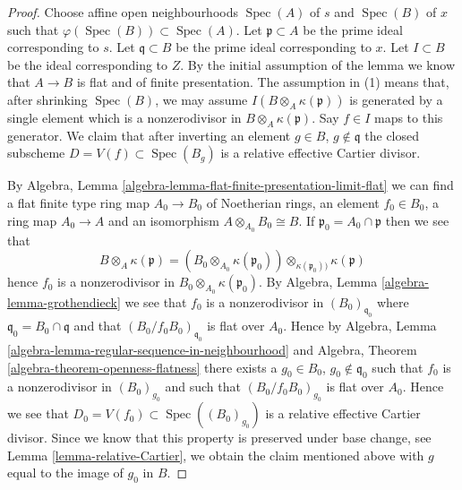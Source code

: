 \documentclass[10pt,a4paper]{amsart}
\theoremstyle{plain}
\theoremstyle{definition}
\theoremstyle{remark}
\numberwithin{equation}{subsection}
\def\Spec{\mathop{\mathrm{Spec}}}
\begin{document}
\begin{proof}
Choose affine open neighbourhoods $\Spec(A)$ of $s$ and
$\Spec(B)$ of $x$ such that
$\varphi(\Spec(B)) \subset \Spec(A)$.
Let $\mathfrak p \subset A$ be the prime ideal corresponding to $s$.
Let $\mathfrak q \subset B$ be the prime ideal corresponding to $x$.
Let $I \subset B$ be the ideal corresponding to $Z$.
By the initial assumption of the lemma we know that
$A \to B$ is flat and of finite presentation.
The assumption in (1) means that, after shrinking $\Spec(B)$, we may
assume $I(B \otimes_A \kappa(\mathfrak p))$ is generated by a single
element which is a nonzerodivisor in $B \otimes_A \kappa(\mathfrak p)$.
Say $f \in I$ maps to this generator. We claim that after inverting
an element $g \in B$, $g \not \in \mathfrak q$ the closed subscheme
$D = V(f) \subset \Spec(B_g)$ is a relative effective Cartier
divisor.

\medskip\noindent
By
Algebra, Lemma \ref{algebra-lemma-flat-finite-presentation-limit-flat}
we can find a flat finite type ring map $A_0 \to B_0$ of Noetherian
rings, an element $f_0 \in B_0$, a ring map $A_0 \to A$ and an isomorphism
$A \otimes_{A_0} B_0 \cong B$. If $\mathfrak p_0 = A_0 \cap \mathfrak p$
then we see that
$$
B \otimes_A \kappa(\mathfrak p) =
\left(B_0 \otimes_{A_0} \kappa(\mathfrak p_0)\right)
\otimes_{\kappa(\mathfrak p_0))} \kappa(\mathfrak p)
$$
hence $f_0$ is a nonzerodivisor in $B_0 \otimes_{A_0} \kappa(\mathfrak p_0)$.
By
Algebra, Lemma \ref{algebra-lemma-grothendieck}
we see that $f_0$ is a nonzerodivisor in $(B_0)_{\mathfrak q_0}$
where $\mathfrak q_0 = B_0 \cap \mathfrak q$ and
that $(B_0/f_0B_0)_{\mathfrak q_0}$ is flat over $A_0$. Hence by
Algebra, Lemma \ref{algebra-lemma-regular-sequence-in-neighbourhood}
and
Algebra, Theorem \ref{algebra-theorem-openness-flatness}
there exists a $g_0 \in B_0$, $g_0 \not \in \mathfrak q_0$ such
that $f_0$ is a nonzerodivisor in $(B_0)_{g_0}$ and such that
$(B_0/f_0B_0)_{g_0}$ is flat over $A_0$. Hence we see that
$D_0 = V(f_0) \subset \Spec((B_0)_{g_0})$ is a relative effective
Cartier divisor. Since we know that this property is preserved under
base change, see
Lemma \ref{lemma-relative-Cartier},
we obtain the claim mentioned above with $g$ equal to the image of $g_0$
in $B$.


\end{proof}
\end{document}
